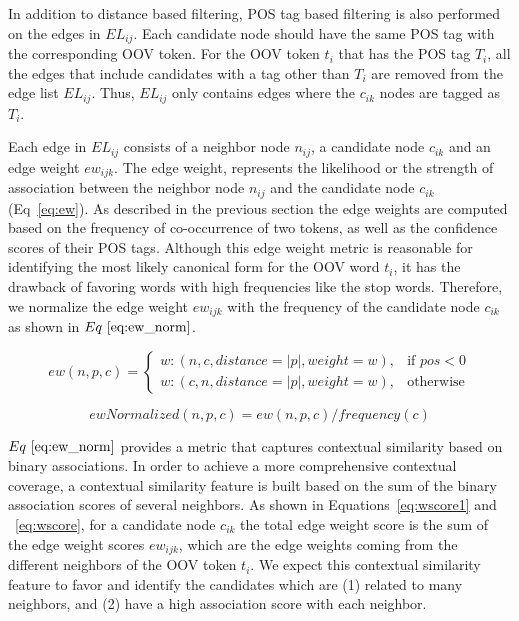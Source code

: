 \documentclass[preprint,review,12pt]{elsarticle}
\begin{document}
In addition to distance based filtering, POS tag based filtering is also performed on the edges in $EL_{ij}$. Each candidate node should have the same POS tag with the corresponding OOV token. For the OOV token $t_i$ that has the POS tag $T_i$, all the edges that include candidates with a tag other than $T_i$ are removed from the edge list $EL_{ij}$. Thus, $EL_{ij}$ only contains edges where the $c_{ik}$ nodes are tagged as $T_i$.

Each edge in $EL_{ij}$ consists of a neighbor node $n_{ij}$, a candidate node $c_{ik}$ and an edge weight $ew_{ijk}$. The edge weight, represents the likelihood or the strength of association between the neighbor node $n_{ij}$ and the candidate node $c_{ik}$ (Eq~\ref{eq:ew}). As described in the previous section the edge weights are computed based on the frequency of co-occurrence of two tokens, as well as the confidence scores of their POS tags.
Although this edge weight metric is reasonable for identifying the most likely canonical form for the OOV word $t_i$, it has the drawback of favoring words with high frequencies like the stop words. Therefore, we normalize the edge weight $ew_{ijk}$ with the frequency of the candidate node $c_{ik}$ as shown in $Eq~\ref{eq:ew_norm}$.

\begin{equation}
ew(n,p,c) =
\begin{cases}
  w : (n,c,distance = |p|,weight=w), & \text{if } pos < 0 \\
  w : (c,n,distance = |p|,weight=w), & \text{otherwise}
\end{cases}
\label{eq:ew}
\end{equation}

\begin{equation}
ewNormalized(n,p,c) = ew(n,p,c) / frequency(c)
\label{eq:ew_norm}
\end{equation}

$Eq~\ref{eq:ew_norm}$ provides a metric that captures contextual similarity based on binary associations.
In order to achieve a more comprehensive contextual coverage, a contextual similarity feature is built based on the sum of the binary association scores of several neighbors. As shown in Equations~\ref{eq:wscore1} and ~\ref{eq:wscore}, for a candidate node $c_{ik}$ the total edge weight score is the sum of the edge weight scores $ew_{ijk}$, which are the edge weights coming from the different neighbors of the OOV token $t_i$. We expect this contextual similarity feature to favor and identify the candidates which are (1) related to many neighbors, and (2) have a high association score with each neighbor.
\end{document}
